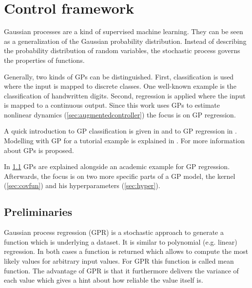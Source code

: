 \chapter{Control framework}
\label{cha:framework}

Gaussian processes are a kind of supervised machine learning.
They can be seen as a generalization of the Gaussian probability distribution.
Instead of describing the probability distribution of random variables, the stochastic process governs the properties of functions.

Generally, two kinds of GPs can be distinguished.
First, classification is used where the input is mapped to discrete classes.
One well-known example is the classification of handwritten digits.
Second, regression is applied where the input is mapped to a continuous output.
Since this work uses GPs to estimate nonlinear dynamics (\cref{sec:augmentedcontroller}) the focus is on GP regression.

A quick introduction to GP classification is given in \cite{Ebden.2008b} and to GP regression in \cite{Ebden.2008}.
Modelling with GP for a tutorial example is explained in \cite{Gray.2003}.
For more information about GPs \cite{Rasmussen.2006} is proposed.

In \cref{sec:gpex} GPs are explained alongside an academic example for GP regression.
Afterwards, the focus is on two more specific parts of a GP model, the kernel (\cref{sec:covfun}) and his hyperparameters (\cref{sec:hyper}).


\section{Preliminaries}
\label{sec:gpex}
Gaussian process regression (GPR) is a stochastic approach to generate a function which is underlying a dataset.
It is similar to polynomial (e.g. linear) regression.
In both cases a function is returned which allows to compute the most likely values for arbitrary input values.
For GPR this function is called mean function.
The advantage of GPR is that it furthermore delivers the variance of each value which gives a hint about how reliable the value itself is.

